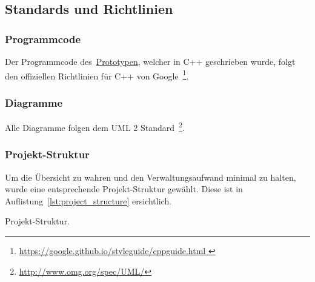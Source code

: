 \subsection{Standards und Richtlinien}
\label{subsec:standards_guidelines}

\subsubsection{Programmcode}
\label{ssubsec:standards_guidelines:code}

Der Programmcode des~\hyperref[chap:prototype]{Prototypen}, welcher in C++ geschrieben wurde, folgt
den offiziellen Richtlinien für C++ von Google~\footnote{
    \href{https://google.github.io/styleguide/cppguide.html}{
        https://google.github.io/styleguide/cppguide.html
    }
}.

\subsubsection{Diagramme}
\label{ssubsec:standards_guidelines:diagrams}

Alle Diagramme folgen dem UML 2 Standard~\footnote{
    \href{http://www.omg.org/spec/UML/}{http://www.omg.org/spec/UML/}}.

\subsubsection{Projekt-Struktur}
\label{ssubsec:standards_guidelines:project_structure}

Um die Übersicht zu wahren und den Verwaltungsaufwand minimal zu halten,
wurde eine entsprechende Projekt-Struktur gewählt. Diese ist in
Auflistung~\ref{lst:project_structure} ersichtlich.

\begin{listing}
	\caption{Projekt-Struktur.}\label{lst:project_structure}
\end{listing}
